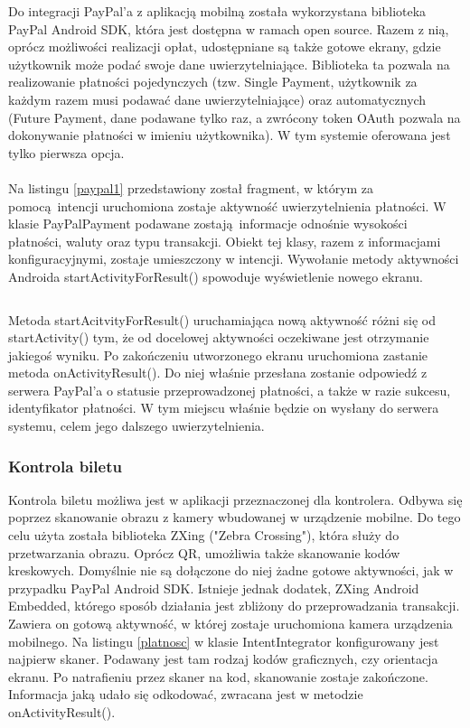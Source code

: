 Do integracji PayPal'a z aplikacją mobilną została wykorzystana biblioteka PayPal Android SDK, która jest dostępna w ramach open source. Razem z nią, oprócz możliwości realizacji opłat, udostępniane są także gotowe ekrany, gdzie użytkownik może podać swoje dane uwierzytelniające. Biblioteka ta pozwala na realizowanie płatności pojedynczych (tzw. Single Payment, użytkownik za każdym razem musi podawać dane uwierzytelniające) oraz automatycznych (Future Payment, dane podawane tylko raz, a zwrócony token OAuth pozwala na dokonywanie płatności w imieniu użytkownika). W tym systemie oferowana jest tylko pierwsza opcja.
\\
\\
Na listingu \ref{paypal1} przedstawiony został fragment, w którym za pomocą intencji uruchomiona zostaje aktywność uwierzytelnienia płatności. W klasie PayPalPayment podawane zostają informacje odnośnie wysokości płatności, waluty oraz typu transakcji. Obiekt tej klasy, razem z informacjami konfiguracyjnymi, zostaje umieszczony w intencji. Wywołanie metody aktywności Androida startActivityForResult() spowoduje wyświetlenie nowego ekranu.

\begin{singlespace}
	\label{paypal1}
	\vspace{0.3cm}
	\inputminted[fontsize=\footnotesize, linenos=true]{java}{src/imp/get-payment.java}
\end{singlespace}

Metoda startAcitvityForResult() uruchamiająca nową aktywność różni się od startActivity() tym, że od docelowej aktywności oczekiwane jest otrzymanie jakiegoś wyniku. Po zakończeniu utworzonego ekranu uruchomiona zastanie metoda onActivityResult(). Do niej właśnie przesłana zostanie odpowiedź z serwera PayPal'a o statusie przeprowadzonej płatności, a także w razie sukcesu, identyfikator płatności. W tym miejscu właśnie będzie on wysłany do serwera systemu, celem jego dalszego uwierzytelnienia.

\subsubsection*{Kontrola biletu}

Kontrola biletu możliwa jest w aplikacji przeznaczonej dla kontrolera. Odbywa się poprzez skanowanie obrazu z kamery wbudowanej w urządzenie mobilne. Do tego celu użyta została biblioteka ZXing ("Zebra Crossing"), która służy do przetwarzania obrazu. Oprócz QR, umożliwia także skanowanie kodów kreskowych. Domyślnie nie są dołączone do niej żadne gotowe aktywności, jak w przypadku PayPal Android SDK. Istnieje jednak dodatek, ZXing Android Embedded, którego sposób działania jest zbliżony do przeprowadzania transakcji. Zawiera on gotową aktywność, w której zostaje uruchomiona kamera urządzenia mobilnego. Na listingu \ref{platnosc} w klasie IntentIntegrator konfigurowany jest najpierw skaner. Podawany jest tam rodzaj kodów graficznych, czy orientacja ekranu. Po natrafieniu przez skaner na kod, skanowanie zostaje zakończone. Informacja jaką udało się odkodować, zwracana jest w metodzie onActivityResult().

